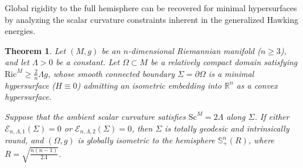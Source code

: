 \documentclass[12pt,a4paper]{amsart}
\theoremstyle{plain}
\newtheorem{theorem}{Theorem}[section]
\theoremstyle{definition}
\begin{document}
Global rigidity to the full hemisphere can be recovered for minimal hypersurfaces by analyzing the scalar curvature constraints inherent in the generalized Hawking energies.
\begin{theorem}\label{thm:minimal_hemisphere_rigidity_higher}
Let $(M,g)$ be an $n$-dimensional Riemannian manifold ($n \ge 3$), and let $\Lambda > 0$ be a constant. Let $\Omega \subset M$ be a relatively compact domain satisfying $\mathrm{Ric}^M \ge \frac{2}{n}\Lambda g$, whose  smooth connected boundary $\Sigma = \partial\Omega$ is a minimal hypersurface ($H \equiv 0$) admitting an isometric embedding into $\mathbb{R}^n$ as a convex hypersurface. 

Suppose that the ambient scalar curvature satisfies $\mathrm{Sc}^M = 2\Lambda$ along $\Sigma$. If either $\mathcal{E}_{n,\Lambda,1}(\Sigma) = 0$ or $\mathcal{E}_{n,\Lambda,2}(\Sigma) = 0$, then $\Sigma$ is totally geodesic and intrinsically round, and $(\Omega,g)$ is globally isometric to the hemisphere $\mathbb{S}^n_+(R)$, where $R = \sqrt{\frac{n(n-1)}{2\Lambda}}$.
\end{theorem}
\end{document}
